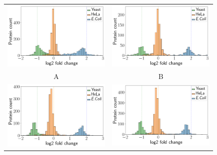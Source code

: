 \documentclass[10pt,letterpaper]{article}
\providecommand{\DIFaddbeginFL}{} %
\providecommand{\DIFaddendFL}{} %
\providecommand{\DIFdelbeginFL}{} %
\providecommand{\DIFdelendFL}{} %
\newcommand{\DIFscaledelfig}{0.5}
\newlength{\DIFdelgraphicswidth} %
\newlength{\DIFdelgraphicsheight} %
\newcommand{\DIFaddincludegraphics}[2][]{{\color{blue}\fbox{\DIFOincludegraphics[#1]{#2}}}} %
\newcommand{\DIFdelincludegraphics}[2][]{%
\sbox{\DIFdelgraphicsbox}{\DIFOincludegraphics[#1]{#2}}%
\settoboxwidth{\DIFdelgraphicswidth}{\DIFdelgraphicsbox} %
\settoboxtotalheight{\DIFdelgraphicsheight}{\DIFdelgraphicsbox} %
\scalebox{\DIFscaledelfig}{%
\parbox[b]{\DIFdelgraphicswidth}{\usebox{\DIFdelgraphicsbox}\\[-\baselineskip] \rule{\DIFdelgraphicswidth}{0em}}\llap{\resizebox{\DIFdelgraphicswidth}{\DIFdelgraphicsheight}{%
\setlength{\unitlength}{\DIFdelgraphicswidth}%
\begin{picture}(1,1)%
\thicklines\linethickness{2pt} %
{\color[rgb]{1,0,0}\put(0,0){\framebox(1,1){}}}%
{\color[rgb]{1,0,0}\put(0,0){\line( 1,1){1}}}%
{\color[rgb]{1,0,0}\put(0,1){\line(1,-1){1}}}%
\end{picture}%
}\hspace*{3pt}}} %
} %
\DeclareRobustCommand{\DIFaddbeginFL}{\DIFOaddbeginFL \let\includegraphics\DIFaddincludegraphics} %
\DeclareRobustCommand{\DIFaddendFL}{\DIFOaddendFL \let\includegraphics\DIFOincludegraphics} %
\DeclareRobustCommand{\DIFdelbeginFL}{\DIFOdelbeginFL \let\includegraphics\DIFdelincludegraphics} %
\DeclareRobustCommand{\DIFdelendFL}{\DIFOaddendFL \let\includegraphics\DIFOincludegraphics} %
\begin{document}
\begin{figure}[hbt]
    \centering
    \begin{tabular}{cc}
	    \DIFdelbeginFL %
\DIFdelendFL \DIFaddbeginFL \includegraphics[width=0.4\linewidth]{./img/histogram_ID_triqler.png} \DIFaddendFL & 
	    \DIFdelbeginFL %
\DIFdelendFL \DIFaddbeginFL \includegraphics[width=0.4\linewidth]{./img/histogram_ID_top3.png} \DIFaddendFL \\ 
        A & B \\ 
	    \DIFdelbeginFL %
\DIFdelendFL \DIFaddbeginFL \includegraphics[width=0.4\linewidth]{./img/histogram_ID_msstats.png} \DIFaddendFL & 
	    \DIFdelbeginFL %
\DIFdelendFL \DIFaddbeginFL \includegraphics[width=0.4\linewidth]{./img/histogram_ID_msqrob2.png} \DIFaddendFL \\

\end{tabular}
\end{figure}
\end{document}
